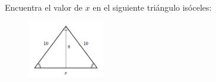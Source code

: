 \question[15] Encuentra el valor de $x$ en el siguiente triángulo isóceles:
\begin{figure}[H]
    \begin{center}
        \includegraphics[width=0.3\textwidth]{../images/pitagoras6.png}
    \end{center}
    \caption{}
    \label{fig:pitagoras6}
\end{figure}

